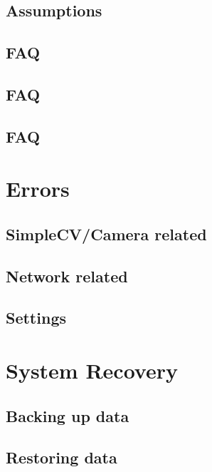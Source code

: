 \documentclass[a4paper]{article}
\begin{document}
    \subsection{Assumptions}
    \subsection{FAQ}
    \subsection{FAQ}
    \subsection{FAQ}
\section{Errors}
    \subsection{SimpleCV/Camera related}
    \subsection{Network related}
    \subsection{Settings}
\section{System Recovery}
    \subsection{Backing up data}
    \subsection{Restoring data}
\end{document}
